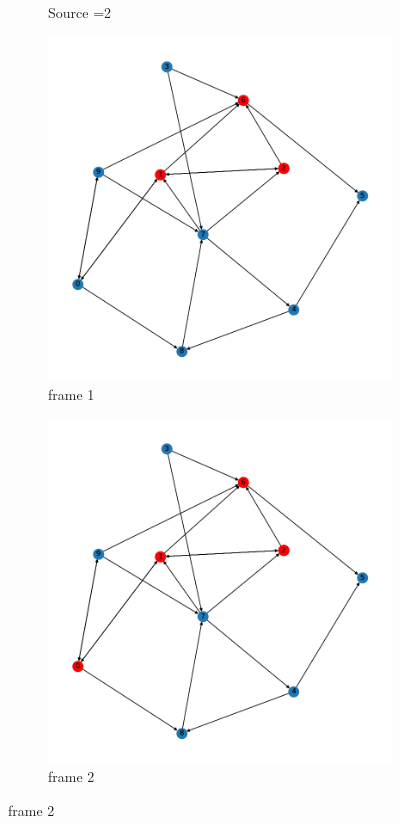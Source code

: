 \documentclass{article}
\begin{document}
\begin{problem}
\begin{figure}[!h]
\begin{subfigure}{0.2\textwidth}
        \caption{Source =2}
    \end{subfigure}
    \begin{subfigure}{0.2\textwidth}
        \includegraphics[width=\textwidth]{./img/P1_2/frame1.png}
        \caption{frame 1}
    \end{subfigure}
    \begin{subfigure}{0.2\textwidth}
        \includegraphics[width=\textwidth]{./img/P1_2/frame2.png}
        \caption{frame 2}
    \end{subfigure}


\end{figure}
\end{problem}
\end{document}
